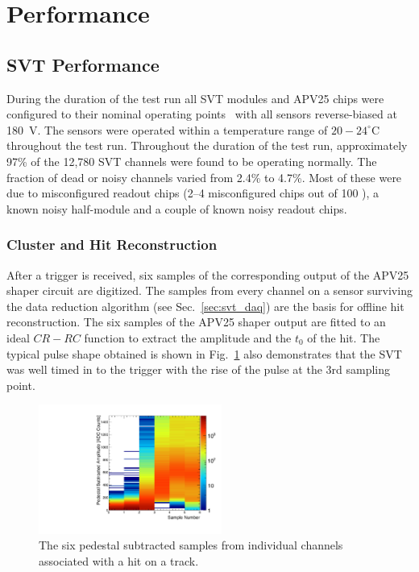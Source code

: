 \documentclass[final,3p,times,twocolumn]{elsarticle}
\begin{document}


\section{Performance}

\subsection{SVT Performance}

During the duration of the test run all SVT modules and APV25 chips were configured to their 
nominal operating points~\cite{Jones:1069892} with all sensors reverse-biased at 180~V.  The 
sensors were operated within a temperature range of  $20-24^\circ$C 
throughout the test run. 
Throughout the duration of the test run, approximately 97\% of the 12,780 SVT channels were found to
be operating normally. The fraction of dead or noisy channels varied from 2.4\% to 4.7\%.  
Most of these were due to misconfigured readout chips (2--4 misconfigured chips out of 100 ), 
a known noisy half-module and a couple of known noisy readout chips. 


\subsubsection{Cluster and Hit Reconstruction}

After a trigger is received, six samples of the corresponding output of the APV25 shaper circuit are digitized. The samples from every channel on a sensor surviving the 
data reduction algorithm (see Sec.~\ref{sec:svt_daq}) are the basis for offline hit reconstruction. 
The six samples of the APV25 shaper output 
are fitted to an ideal $CR-RC$ function to extract the amplitude and the $t_0$ of the hit. 
The typical pulse shape obtained is shown in Fig.~\ref{fig:pulse_shape} also demonstrates that the SVT 
was well timed in to the trigger with the rise of the pulse at the 3rd sampling point.
\begin{figure}[]
\begin{center}
{\small
	\includegraphics[width=6cm]{figures/run1351_110513_samples_L1_top.pdf}
	\caption{The six pedestal subtracted samples from individual channels associated with a hit on a 
	track.}
	\label{fig:pulse_shape}
}
\end{center}
\end{figure}
\end{document}
